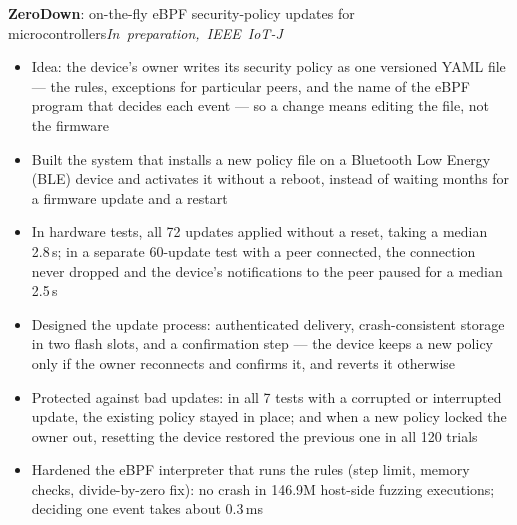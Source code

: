 \documentclass[10pt]{article}
\newcommand{\project}[3]{%
 \par\needspace{3\baselineskip}\vspace{10pt}%
 {\noindent\hspace*{1.8em}\textbf{#1}#2\hfill\mbox{\small\itshape #3}\par}%
}
\begin{document}
\project{ZeroDown}{: on-the-fly eBPF security-policy updates for microcontrollers}{In preparation, IEEE IoT-J}
\begin{itemize}[leftmargin=3em]
 \item Idea: the device's owner writes its security policy as one versioned YAML file --- the rules, exceptions for particular peers, and the name of the eBPF program that decides each event --- so a change means editing the file, not the firmware
 \item Built the system that installs a new policy file on a Bluetooth Low Energy (BLE) device and activates it without a reboot, instead of waiting months for a firmware update and a restart
 \item In hardware tests, all 72 updates applied without a reset, taking a median 2.8\,s; in a separate 60-update test with a peer connected, the connection never dropped and the device's notifications to the peer paused for a median 2.5\,s
 \item Designed the update process: authenticated delivery, crash-consistent storage in two flash slots, and a confirmation step --- the device keeps a new policy only if the owner reconnects and confirms it, and reverts it otherwise
 \item Protected against bad updates: in all 7 tests with a corrupted or interrupted update, the existing policy stayed in place; and when a new policy locked the owner out, resetting the device restored the previous one in all 120 trials
 \item Hardened the eBPF interpreter that runs the rules (step limit, memory checks, divide-by-zero fix): no crash in 146.9M host-side fuzzing executions; deciding one event takes about 0.3\,ms
\end{itemize}
\end{document}
